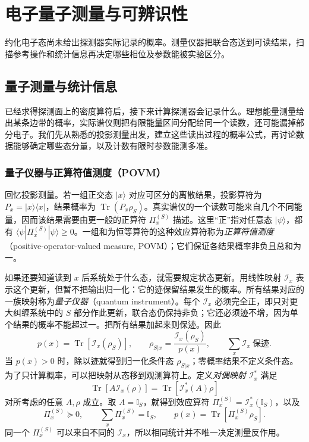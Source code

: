 \chapter{电子量子测量与可辨识性}\label{chap:electron-quantum-measurement}

约化电子态尚未给出探测器实际记录的概率。测量仪器把联合态送到可读结果，扫描参考操作和统计信息再决定哪些相位及参数能被实验区分。

\section{量子测量与统计信息}

已经求得探测面上的密度算符后，接下来计算探测器会记录什么。理想能量测量给出某条边带的概率，实际谱仪则把有限能量区间分配给同一个读数，还可能漏掉部分电子。我们先从熟悉的投影测量出发，建立这些读出过程的概率公式，再讨论数据能够确定哪些态分量，以及计数有限时参数能测多准。

\subsection{量子仪器与正算符值测度（POVM）}

回忆投影测量。若一组正交态 $|x\rangle$ 对应可区分的离散结果，投影算符为 $P_x=|x\rangle\langle x|$，结果概率为 $\operatorname{Tr}(P_x\rho_S)$。真实谱仪的一个读数可能来自几个不同能量，因而该结果需要由更一般的正算符 $\Pi_x^{(S)}$ 描述。这里“正”指对任意态 $|\psi\rangle$，都有 $\langle\psi|\Pi_x^{(S)}|\psi\rangle\ge0$。一组和为恒等算符的这种效应算符称为\emph{正算符值测度}（positive-operator-valued measure, POVM）；它们保证各结果概率非负且总和为一。

如果还要知道读到 $x$ 后系统处于什么态，就需要规定状态更新。用线性映射 $\mathcal I_x$ 表示这个更新，但暂不把输出归一化：它的迹保留结果发生的概率。所有结果对应的一族映射称为\emph{量子仪器}（quantum instrument）。每个 $\mathcal I_x$ 必须完全正，即只对更大纠缠系统中的 $S$ 部分作此更新，联合态仍保持非负；它还必须迹不增，因为单个结果的概率不能超过一。把所有结果加起来则保迹。因此
\begin{equation}
\boxed{
p(x)=\operatorname{Tr}[\mathcal I_x(\rho_S)],
\qquad
\rho_{S|x}=\frac{\mathcal I_x(\rho_S)}{p(x)},
\qquad
\sum_x\mathcal I_x\ \text{保迹}.}
\label{eq:quantum_instrument_probability_definition}
\end{equation}
当 $p(x)>0$ 时，除以迹就得到归一化条件态 $\rho_{S|x}$；零概率结果不定义条件态。为了只计算概率，可以把映射从态移到观测算符上。定义\emph{对偶映射} $\mathcal I_x^*$ 满足
\[
\operatorname{Tr}[A\mathcal I_x(\rho)]
=\operatorname{Tr}[\mathcal I_x^*(A)\rho]
\]
对所考虑的任意 $A,\rho$ 成立。取 $A=\mathbb I_S$，就得到效应算符 $\Pi_x^{(S)}=\mathcal I_x^*(\mathbb I_S)$，以及
\begin{equation}
\boxed{
\Pi_x^{(S)}\succeq0,
\qquad
\sum_x\Pi_x^{(S)}=\mathbb I_S,
\qquad
p(x)=\operatorname{Tr}[\Pi_x^{(S)}\rho_S].}
\label{eq:abstract_instrument_to_povm}
\end{equation}
同一个 $\Pi_x^{(S)}$ 可以来自不同的 $\mathcal I_x$，所以相同统计并不唯一决定测量反作用。


